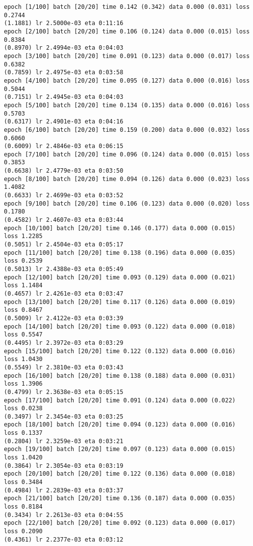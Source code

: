 \documentclass[11pt]{article}
\begin{document}
    \begin{Verbatim}[commandchars=\\\{\}]
epoch [1/100] batch [20/20] time 0.142 (0.342) data 0.000 (0.031) loss 0.2744
(1.1881) lr 2.5000e-03 eta 0:11:16
epoch [2/100] batch [20/20] time 0.106 (0.124) data 0.000 (0.015) loss 0.8384
(0.8970) lr 2.4994e-03 eta 0:04:03
epoch [3/100] batch [20/20] time 0.091 (0.123) data 0.000 (0.017) loss 0.6382
(0.7859) lr 2.4975e-03 eta 0:03:58
epoch [4/100] batch [20/20] time 0.095 (0.127) data 0.000 (0.016) loss 0.5044
(0.7151) lr 2.4945e-03 eta 0:04:03
epoch [5/100] batch [20/20] time 0.134 (0.135) data 0.000 (0.016) loss 0.5703
(0.6317) lr 2.4901e-03 eta 0:04:16
epoch [6/100] batch [20/20] time 0.159 (0.200) data 0.000 (0.032) loss 0.6060
(0.6009) lr 2.4846e-03 eta 0:06:15
epoch [7/100] batch [20/20] time 0.096 (0.124) data 0.000 (0.015) loss 0.3853
(0.6638) lr 2.4779e-03 eta 0:03:50
epoch [8/100] batch [20/20] time 0.094 (0.126) data 0.000 (0.023) loss 1.4082
(0.6633) lr 2.4699e-03 eta 0:03:52
epoch [9/100] batch [20/20] time 0.106 (0.123) data 0.000 (0.020) loss 0.1780
(0.4582) lr 2.4607e-03 eta 0:03:44
epoch [10/100] batch [20/20] time 0.146 (0.177) data 0.000 (0.015) loss 1.2285
(0.5051) lr 2.4504e-03 eta 0:05:17
epoch [11/100] batch [20/20] time 0.138 (0.196) data 0.000 (0.035) loss 0.2539
(0.5013) lr 2.4388e-03 eta 0:05:49
epoch [12/100] batch [20/20] time 0.093 (0.129) data 0.000 (0.021) loss 1.1484
(0.4657) lr 2.4261e-03 eta 0:03:47
epoch [13/100] batch [20/20] time 0.117 (0.126) data 0.000 (0.019) loss 0.8467
(0.5009) lr 2.4122e-03 eta 0:03:39
epoch [14/100] batch [20/20] time 0.093 (0.122) data 0.000 (0.018) loss 0.5547
(0.4495) lr 2.3972e-03 eta 0:03:29
epoch [15/100] batch [20/20] time 0.122 (0.132) data 0.000 (0.016) loss 1.0430
(0.5549) lr 2.3810e-03 eta 0:03:43
epoch [16/100] batch [20/20] time 0.138 (0.188) data 0.000 (0.031) loss 1.3906
(0.4799) lr 2.3638e-03 eta 0:05:15
epoch [17/100] batch [20/20] time 0.091 (0.124) data 0.000 (0.022) loss 0.0238
(0.3497) lr 2.3454e-03 eta 0:03:25
epoch [18/100] batch [20/20] time 0.094 (0.123) data 0.000 (0.016) loss 0.1337
(0.2804) lr 2.3259e-03 eta 0:03:21
epoch [19/100] batch [20/20] time 0.097 (0.123) data 0.000 (0.015) loss 1.0420
(0.3864) lr 2.3054e-03 eta 0:03:19
epoch [20/100] batch [20/20] time 0.122 (0.136) data 0.000 (0.018) loss 0.3484
(0.4984) lr 2.2839e-03 eta 0:03:37
epoch [21/100] batch [20/20] time 0.136 (0.187) data 0.000 (0.035) loss 0.8184
(0.3434) lr 2.2613e-03 eta 0:04:55
epoch [22/100] batch [20/20] time 0.092 (0.123) data 0.000 (0.017) loss 0.2090
(0.4361) lr 2.2377e-03 eta 0:03:12

\end{Verbatim}
\end{document}
